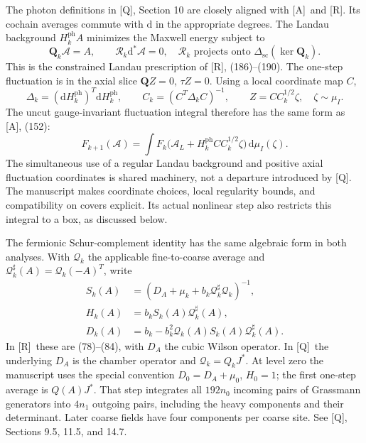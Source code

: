 \documentclass[11pt]{article}
\numberwithin{equation}{section}
\newcommand{\dd}{\mathrm d}
\newcommand{\Q}{\textup{[Q]}}
\newcommand{\AG}{\textup{[A]}}
\newcommand{\UR}{\textup{[R]}}
\begin{document}
The photon definitions in \Q, Section 10 are closely aligned with
\AG\ and \UR. Its cochain averages commute with $\dd$ in the
appropriate degrees. The Landau background $H_k^{\mathrm{ph}}A$
minimizes the Maxwell energy subject to
\begin{equation}
 \mathbf Q_k\mathscr A=A,\qquad
 \mathcal R_k\dd^*\mathscr A=0,
 \quad \mathcal R_k\text{ projects onto }
           \Delta_{\mathrm{sc}}(\ker\mathbf Q_k).
\end{equation}
This is the constrained Landau prescription of \UR, (186)--(190).
The one-step fluctuation is in the axial slice
$\mathbf QZ=0$, $\tau Z=0$. Using a local coordinate map $C$,
\begin{equation}
 \Delta_k=(\dd H_k^{\mathrm{ph}})^T\dd H_k^{\mathrm{ph}},\qquad
 C_k=(C^T\Delta_k C)^{-1},\qquad
 Z=CC_k^{1/2}\zeta,\quad \zeta\sim\mu_I.
 \label{eq:digest-photon}
\end{equation}
The uncut gauge-invariant fluctuation integral therefore has the
same form as \AG, (152):
\begin{equation}
 F_{k+1}(\mathscr A)
 =\int F_k\bigl(\mathscr A_L+
                 H_k^{\mathrm{ph}}CC_k^{1/2}\zeta\bigr)\,\dd\mu_I(\zeta).
\end{equation}
The simultaneous use of a regular Landau background and positive
axial fluctuation coordinates is shared machinery, not a departure
introduced by \Q. The manuscript makes coordinate choices, local
regularity bounds, and compatibility on covers explicit. Its actual
nonlinear step also restricts this integral to a box, as discussed below.

The fermionic Schur-complement identity has the same algebraic form
in both analyses. With $\mathcal Q_k$ the applicable fine-to-coarse
average and $\mathcal Q_k^\sharp(A)=\mathcal Q_k(-A)^T$, write
\begin{align}
 S_k(A)&=(D_A+\mu_k+b_k\mathcal Q_k^\sharp\mathcal Q_k)^{-1},\\
 H_k(A)&=b_kS_k(A)\mathcal Q_k^\sharp(A),\\
 D_k(A)&=b_k-b_k^2\mathcal Q_k(A)S_k(A)\mathcal Q_k^\sharp(A).
 \label{eq:digest-fermion-block}
\end{align}
In \UR\ these are (78)--(84), with $D_A$ the cubic Wilson operator.
In \Q\ the underlying $D_A$ is the chamber operator and
$\mathcal Q_k=Q_kJ^*$. At level zero the manuscript uses the special
convention $D_0=D_A+\mu_0$, $H_0=1$; the first one-step average is
$Q(A)J^*$. That step integrates all $192n_0$ incoming pairs of
Grassmann generators into $4n_1$ outgoing pairs, including the heavy
components and their determinant. Later coarse fields have four
components per coarse site. See \Q, Sections 9.5, 11.5, and 14.7.
\end{document}
